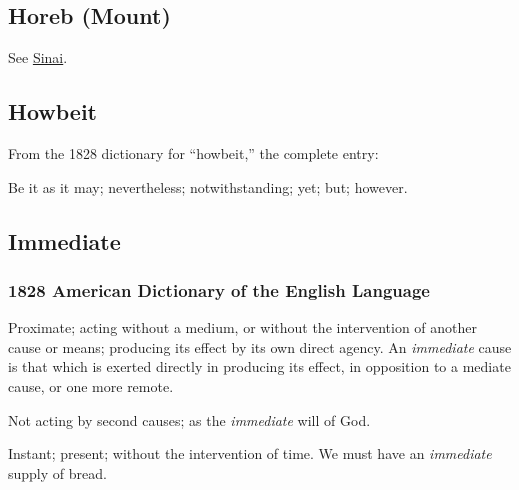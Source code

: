 	\subsection{Horeb (Mount)} %
		\label{HOREB}
		
		See \hyperref[SINAI]{Sinai}.
		
	\subsection{Howbeit} %
		\label{HOWBEIT}
		
		From the 1828 dictionary for ``howbeit,'' the complete entry:
		
		\begin{compactitem}
			\item Be it as it may; nevertheless; notwithstanding; yet; but; however.
		\end{compactitem}


	\subsection{Immediate} %
		\label{IMMEDIATE}
		
		\subsubsection{1828 American Dictionary of the English Language}
		
			\begin{compactitem}
				\item[1] Proximate; acting without a medium, or without the intervention of another cause or means; producing its effect by its own direct agency. An \textit{immediate} cause is that which is exerted directly in producing its effect, in opposition to a mediate cause, or one more remote.
				\item[2] Not acting by second causes; as the \textit{immediate} will of God.
				\item[3] Instant; present; without the intervention of time. We must have an \textit{immediate} supply of bread.
			\end{compactitem}

